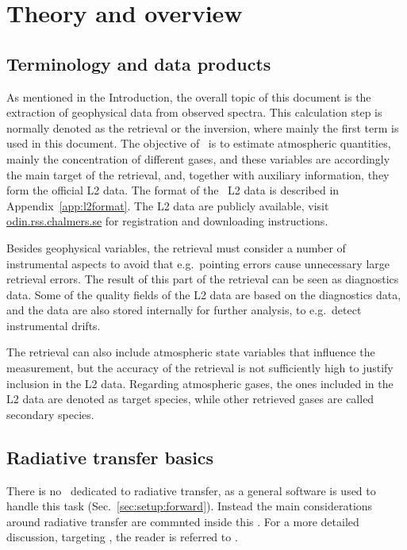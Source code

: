 \chapter{Theory and overview}
\label{chapter:overview}


\section{Terminology and data products}
\label{sec:terminology}
%
As mentioned in the Introduction, the overall topic of this document is the
extraction of geophysical data from observed spectra. This calculation step is
normally denoted as the retrieval or the inversion, where mainly the first term
is used in this document. The objective of \smr\ is to estimate atmospheric
quantities, mainly the concentration of different gases, and these variables
are accordingly the main target of the retrieval, and, together with auxiliary
information, they form the official L2 data. The format of the \smr\ L2 data is
described in Appendix~\ref{app:l2format}. The L2 data are publicly available,
visit \url{odin.rss.chalmers.se} for registration and downloading instructions.

Besides geophysical variables, the retrieval must consider a number of
instrumental aspects to avoid that e.g.\ pointing errors cause unnecessary
large retrieval errors. The result of this part of the retrieval can be seen as
diagnostics data. Some of the quality fields of the L2 data are based on the
diagnostics data, and the data are also stored internally for further analysis, to
e.g.\ detect instrumental drifts. 

The retrieval can also include atmospheric state variables that influence the
measurement, but the accuracy of the retrieval is not sufficiently high to
justify inclusion in the L2 data. Regarding atmospheric gases, the ones
included in the L2 data are denoted as target species, while other retrieved
gases are called secondary species.



\section{Radiative transfer basics}
\label{sec:rt}
%
There is no \ATBD\ dedicated to radiative transfer, as a general software is used
to handle this task (Sec.~\ref{sec:setup:forward}). Instead the main
considerations around radiative transfer are commnted inside this \ATBD. For a
more detailed discussion, targeting \smr, the reader is referred to
\citet{eriksson:studi:02}.

